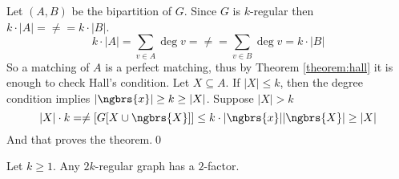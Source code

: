 \begin{prf}
    Let $(A, B)$ be the bipartition of $G$. Since $G$ is $k$-regular then $k \cdot |A| = \ne = k \cdot |B|$.
    \begin{equation*}
        k \cdot |A| = \sum_{v \in A}\deg{v} = \ne = \sum_{v \in B}\deg{v} = k \cdot |B|
    \end{equation*}
    So a matching of $A$ is a perfect matching, thus by Theorem \ref{theorem:hall} it is enough to check Hall's condition. Let $X \subseteq A$. If $|X| \leq k$, then the degree condition implies $|\ngbrs{x}| \geq k \geq |X|$. Suppose $|X| > k$
    \begin{equation*}
        |X| \cdot k = \ne[G[X \cup \ngbrs{X}]] \leq k \cdot |\ngbrs{x}|\\
        |\ngbrs{X}| \geq |X|
    \end{equation*}
    And that proves the theorem.\qed
\end{prf}
\begin{customcorollary}{2.5}
\label{corollary:2.5}
    Let $k \geq 1$. Any $2k$-regular graph has a $2$-factor.
\end{customcorollary}
